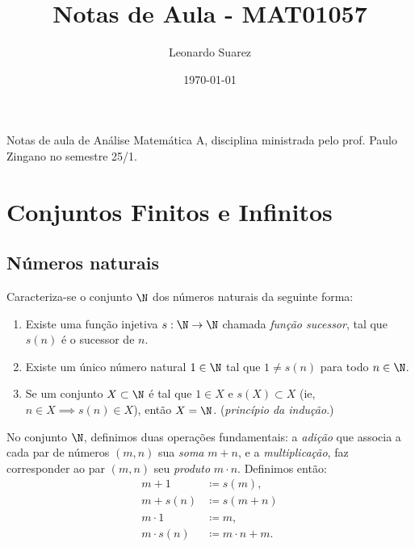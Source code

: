 \documentclass{article}
\title{Notas de Aula - MAT01057}
\author{Leonardo Suarez}
\date{\today}
\begin{document}
\maketitle

Notas de aula de Análise Matemática A, disciplina ministrada pelo prof. Paulo Zingano no semestre 25/1.

\tableofcontents

\section{Conjuntos Finitos e Infinitos}

\subsection{Números naturais}

Caracteriza-se o conjunto \(\N\) dos números naturais da seguinte forma:

\begin{enumerate}
    \item[\textbf{AI}] Existe uma função injetiva \(s : \N \to \N\) chamada \emph{função sucessor}, tal que \(s(n)\) é o sucessor de \(n\).
    \item[\textbf{AII}] Existe um único número natural \(1 \in \N\) tal que \(1 \neq s(n)\) para todo \(n \in \N\).
    \item[\textbf{AIII}] Se um conjunto \(X \subset \N\) é tal que \(1 \in X\) e \(s(X) \subset X\) (ie, \(n \in X \implies s(n) \in X\)), então \(X = \N\). (\emph{princípio da indução}.)
\end{enumerate}

\begin{defn} 
    No conjunto \(\N\), definimos duas operações fundamentais: a \emph{adição} que associa a cada par de números \((m,n)\) sua \emph{soma} \(m+n\), e a \emph{multiplicação}, faz corresponder ao par \((m,n)\) seu \emph{produto} \(m\cdot n\). Definimos então:
    \begin{align}
        m + 1 &\coloneq s(m), \\
        m + s(n) &\coloneq s(m + n) \\
        m \cdot 1 &\coloneq m, \\
        m \cdot s(n) &\coloneq m \cdot n + m.
    \end{align}
\end{defn}
\end{document}
